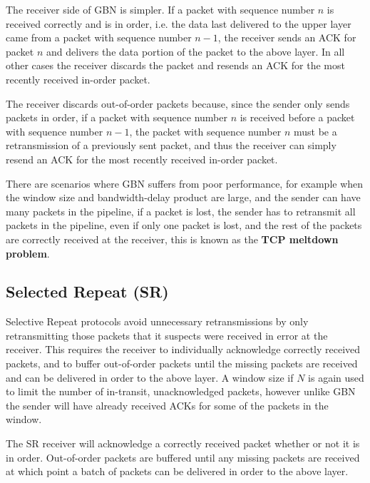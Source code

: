 \documentclass[12pt letter]{report}
\begin{document}
The receiver side of GBN is simpler. If a packet with sequence number
$n$ is received correctly and is in order, i.e. the data last
delivered to the upper layer came from a packet with sequence number
$n -1$, the receiver sends an ACK for packet $n$ and delivers the
data portion of the packet to the above layer. In all other cases the
receiver discards the packet and resends an ACK for the most recently
received in-order packet.

The receiver discards out-of-order packets because, since the sender
only sends packets in order, if a packet with sequence number $n$ is
received before a packet with sequence number $n - 1$, the packet
with sequence number $n$ must be a retransmission of a previously
sent packet, and thus the receiver can simply resend an ACK for the
most recently received in-order packet.

There are scenarios where GBN suffers from poor performance, for
example when the window size and bandwidth-delay product are large,
and the sender can have many packets in the pipeline, if a packet is
lost, the sender has to retransmit all packets in the pipeline, even
if only one packet is lost, and the rest of the packets are correctly
received at the receiver, this is known as the \textbf{TCP meltdown problem}.

\subsection{Selected Repeat (SR)}

Selective Repeat protocols avoid unnecessary retransmissions by only
retransmitting those packets that it suspects were received in error
at the receiver. This requires the receiver to individually
acknowledge correctly received packets, and to buffer out-of-order
packets until the missing packets are received and can be delivered
in order to the above layer. A window size if $N$ is again used to
limit the number of in-transit, unacknowledged packets, however
unlike GBN the sender will have already  received ACKs for some of
the packets in the window.

The SR receiver will acknowledge a correctly received packet whether
or not it is in order. Out-of-order packets are buffered until any
missing packets are received at which point a batch of packets can be
delivered in order to the above layer.
\end{document}
